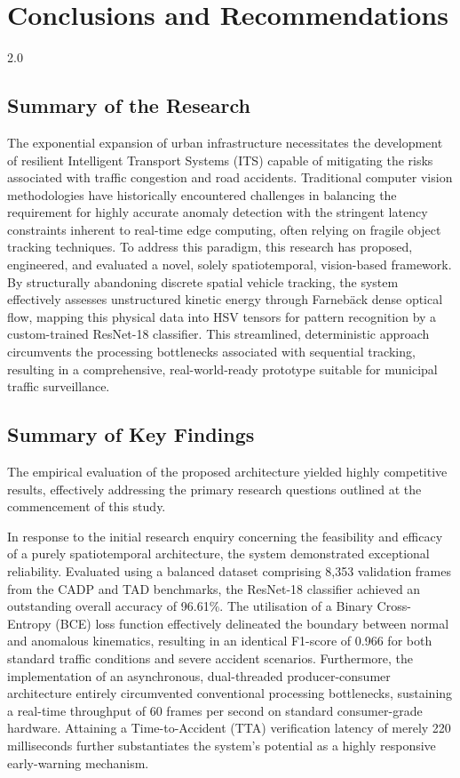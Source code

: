 
\chapter{Conclusions and Recommendations}
\label{ch:conclusion}
\begin{spacing}{2.0}

\section{Summary of the Research}
The exponential expansion of urban infrastructure necessitates the development of resilient Intelligent Transport Systems (ITS) capable of mitigating the risks associated with traffic congestion and road accidents. Traditional computer vision methodologies have historically encountered challenges in balancing the requirement for highly accurate anomaly detection with the stringent latency constraints inherent to real-time edge computing, often relying on fragile object tracking techniques. To address this paradigm, this research has proposed, engineered, and evaluated a novel, solely spatiotemporal, vision-based framework. By structurally abandoning discrete spatial vehicle tracking, the system effectively assesses unstructured kinetic energy through Farnebäck dense optical flow, mapping this physical data into HSV tensors for pattern recognition by a custom-trained ResNet-18 classifier. This streamlined, deterministic approach circumvents the processing bottlenecks associated with sequential tracking, resulting in a comprehensive, real-world-ready prototype suitable for municipal traffic surveillance.
\section{Summary of Key Findings}
The empirical evaluation of the proposed architecture yielded highly competitive results, effectively addressing the primary research questions outlined at the commencement of this study.

In response to the initial research enquiry concerning the feasibility and efficacy of a purely spatiotemporal architecture, the system demonstrated exceptional reliability. Evaluated using a balanced dataset comprising 8,353 validation frames from the CADP and TAD benchmarks, the ResNet-18 classifier achieved an outstanding overall accuracy of 96.61\%. The utilisation of a Binary Cross-Entropy (BCE) loss function effectively delineated the boundary between normal and anomalous kinematics, resulting in an identical F1-score of 0.966 for both standard traffic conditions and severe accident scenarios. Furthermore, the implementation of an asynchronous, dual-threaded producer-consumer architecture entirely circumvented conventional processing bottlenecks, sustaining a real-time throughput of 60 frames per second on standard consumer-grade hardware. Attaining a Time-to-Accident (TTA) verification latency of merely 220 milliseconds further substantiates the system’s potential as a highly responsive early-warning mechanism.


\end{spacing}
